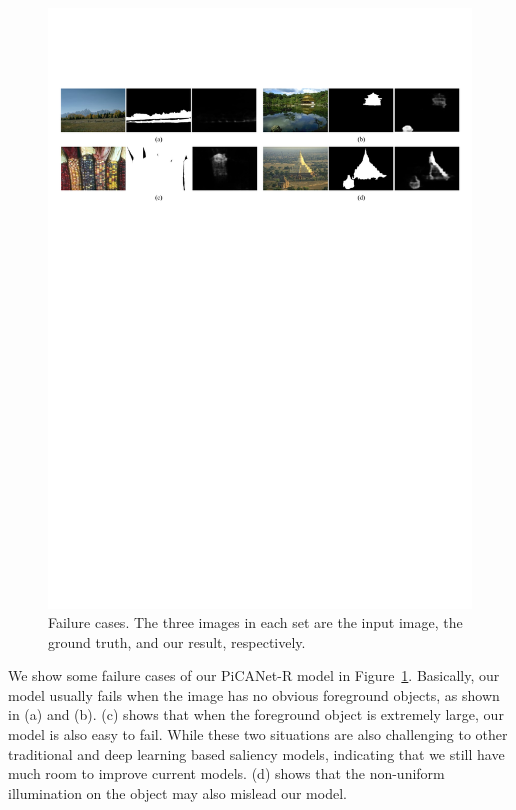 \documentclass[10pt,twocolumn,letterpaper]{article}
\begin{document}
\begin{figure}[!t]
  \graphicspath{{Figures/failureCases/}}
  \centering
  \includegraphics[width=1\linewidth]{failurecases.pdf}
  \caption{Failure cases. The three images in each set are the input image, the ground truth, and our result, respectively.}
  \label{failure_cases}
  \vspace{-0.3cm}
\end{figure}

We show some failure cases of our PiCANet-R model in Figure~\ref{failure_cases}. Basically, our model usually fails when the image has no obvious foreground objects, as shown in (a) and (b). (c) shows that when the foreground object is extremely large, our model is also easy to fail. While these two situations are also challenging to other traditional and deep learning based saliency models, indicating that we still have much room to improve current models. (d) shows that the non-uniform illumination on the object may also mislead our model.

{\small


}
\end{document}
